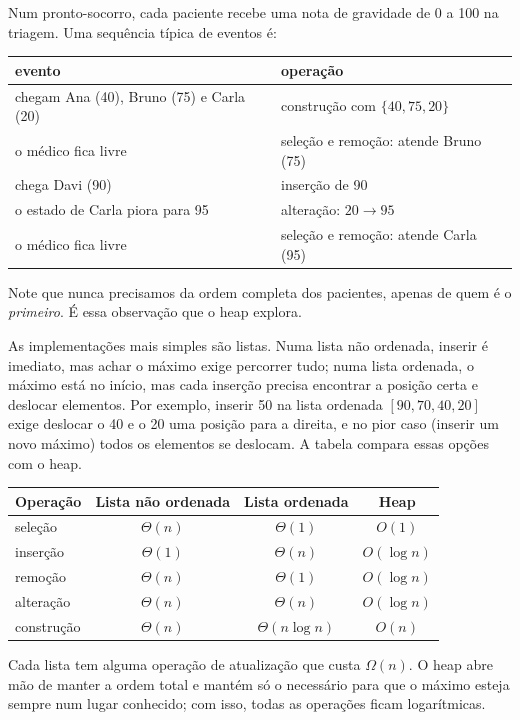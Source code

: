 \begin{exemplo}\label{ex:prontosocorro}
Num pronto-socorro, cada paciente recebe uma nota de gravidade de 0 a 100 na triagem. Uma sequência típica de eventos é:
\begin{center}\small
\begin{tabular}{@{}ll@{}}
\toprule
evento & operação\\
\midrule
chegam Ana (40), Bruno (75) e Carla (20) & construção com $\{40,75,20\}$\\
o médico fica livre & seleção e remoção: atende Bruno (75)\\
chega Davi (90) & inserção de 90\\
o estado de Carla piora para 95 & alteração: $20\to95$\\
o médico fica livre & seleção e remoção: atende Carla (95)\\
\bottomrule
\end{tabular}
\end{center}
Note que nunca precisamos da ordem completa dos pacientes, apenas de quem é o \emph{primeiro}. É essa observação que o heap explora.
\end{exemplo}

As implementações mais simples são listas. Numa lista não ordenada, inserir é imediato, mas achar o máximo exige percorrer tudo; numa lista ordenada, o máximo está no início, mas cada inserção precisa encontrar a posição certa e deslocar elementos. Por exemplo, inserir 50 na lista ordenada $[90,70,40,20]$ exige deslocar o 40 e o 20 uma posição para a direita, e no pior caso (inserir um novo máximo) todos os elementos se deslocam. A tabela compara essas opções com o heap.
\begin{center}
\small
\begin{tabular}{@{}lccc@{}}
\toprule
Operação & Lista não ordenada & Lista ordenada & Heap\\
\midrule
seleção & $\Theta(n)$ & $\Theta(1)$ & $O(1)$\\
inserção & $\Theta(1)$ & $\Theta(n)$ & $O(\log n)$\\
remoção & $\Theta(n)$ & $\Theta(1)$ & $O(\log n)$\\
alteração & $\Theta(n)$ & $\Theta(n)$ & $O(\log n)$\\
construção & $\Theta(n)$ & $\Theta(n\log n)$ & $O(n)$\\
\bottomrule
\end{tabular}
\end{center}
Cada lista tem alguma operação de atualização que custa $\Omega(n)$. O heap abre mão de manter a ordem total e mantém só o necessário para que o máximo esteja sempre num lugar conhecido; com isso, todas as operações ficam logarítmicas.

